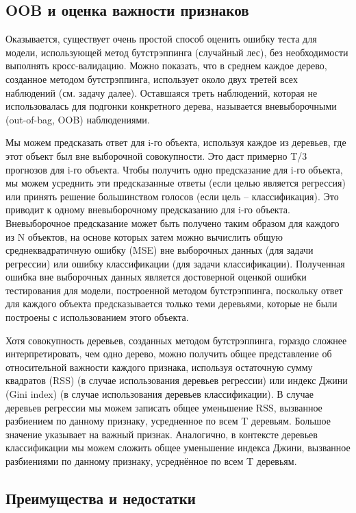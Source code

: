 \subsection*{OOB и оценка важности признаков}
Оказывается, существует очень простой способ оценить ошибку теста для модели, использующей метод бутстрэппинга (случайный лес), без необходимости выполнять кросс-валидацию. Можно показать, что в среднем каждое дерево, созданное методом бутстрэппинга, использует около двух третей всех наблюдений (см. задачу далее). Оставшаяся треть наблюдений, которая не использовалась для подгонки конкретного дерева, называется вневыборочными (out-of-bag, OOB) наблюдениями.

Мы можем предсказать ответ для i-го объекта, используя каждое из деревьев, где этот объект был вне выборочной совокупности. Это даст примерно T/3 прогнозов для i-го объекта. Чтобы получить одно предсказание для i-го объекта, мы можем усреднить эти предсказанные ответы (если целью является регрессия) или принять решение большинством голосов (если цель – классификация). Это приводит к одному вневыборочному предсказанию для i-го объекта. Вневыборочное предсказание может быть получено таким образом для каждого из N объектов, на основе которых затем можно вычислить общую среднеквадратичную ошибку (MSE) вне выборочных данных (для задачи регрессии) или ошибку классификации (для задачи классификации). Полученная ошибка вне выборочных данных является достоверной оценкой ошибки тестирования для модели, построенной методом бутстрэппинга, поскольку ответ для каждого объекта предсказывается только теми деревьями, которые не были построены с использованием этого объекта.

Хотя совокупность деревьев, созданных методом бутстрэппинга, гораздо сложнее интерпретировать, чем одно дерево, можно получить общее представление об относительной важности каждого признака, используя остаточную сумму квадратов (RSS) (в случае использования деревьев регрессии) или индекс Джини (Gini index) (в случае использования деревьев классификации). В случае деревьев регрессии мы можем записать общее уменьшение RSS, вызванное разбиением по данному признаку, усредненное по всем T деревьям. Большое значение указывает на важный признак. Аналогично, в контексте деревьев классификации мы можем сложить общее уменьшение индекса Джини, вызванное разбиениями по данному признаку, усреднённое по всем T деревьям.


\subsection*{Преимущества и недостатки}

